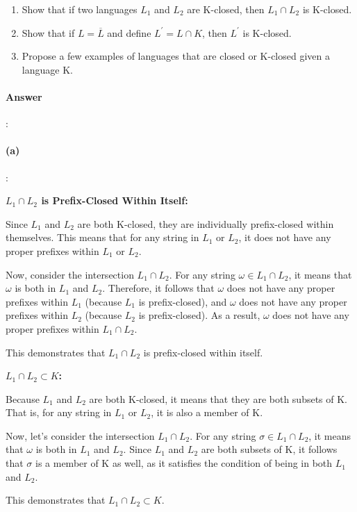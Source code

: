 \documentclass{article}
\begin{document}
\begin{enumerate}[label=(\alph*)]
  \item Show that if two languages $L_1$ and $L_2$ are K-closed, then $L_1 \cap L_2$ is K-closed.
  \item Show that if $L = \overline{L}$ and define $L^\prime  = L \cap K$, then $L^\prime$ is K-closed.
  \item Propose a few examples of languages that are closed or K-closed given a language K.
\end{enumerate}

\paragraph{Answer}:

\paragraph{(a)}:

\textbf{$L_1 \cap L_2$ is Prefix-Closed Within Itself:}

Since $L_1$ and $L_2$ are both K-closed, they are individually prefix-closed within themselves. This means that for any string in $L_1$ or $L_2$, it does not have any proper prefixes within $L_1$ or $L_2$.

Now, consider the intersection $L_1 \cap L_2$. For any string $\omega \in L_1 \cap L_2$, it means that $\omega$ is both in $L_1$ and $L_2$. Therefore, it follows that $\omega$ does not have any proper prefixes within $L_1$ (because $L_1$ is prefix-closed), and $\omega$ does not have any proper prefixes within $L_2$ (because $L_2$ is prefix-closed). As a result, $\omega$ does not have any proper prefixes within $L_1 \cap L_2$.

This demonstrates that $L_1 \cap L_2$ is prefix-closed within itself.

\textbf{$L_1 \cap L_2 \subset K$:}

Because $L_1$ and $L_2$ are both K-closed, it means that they are both subsets of K. That is, for any string in $L_1$ or $L_2$, it is also a member of K.

Now, let's consider the intersection $L_1 \cap L_2$. For any string $\sigma \in L_1 \cap L_2$, it means that $\omega$ is both in $L_1$ and $L_2$. Since $L_1$ and $L_2$ are both subsets of K, it follows that $\sigma$ is a member of K as well, as it satisfies the condition of being in both $L_1$ and $L_2$.

This demonstrates that $L_1 \cap L_2 \subset K$.
\end{document}
